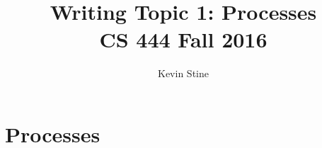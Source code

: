 \documentclass[letterpaper,10pt,draftclsnofoot,onecolumn,titlepage]{IEEEtran}
\def\name{Kevin Stine}
\begin{document}
	\title{\huge Writing Topic 1: Processes\\CS 444 Fall 2016}
	\author{\large \name}
	\maketitle
	\newpage
	\section*{Processes}
\end{document}
